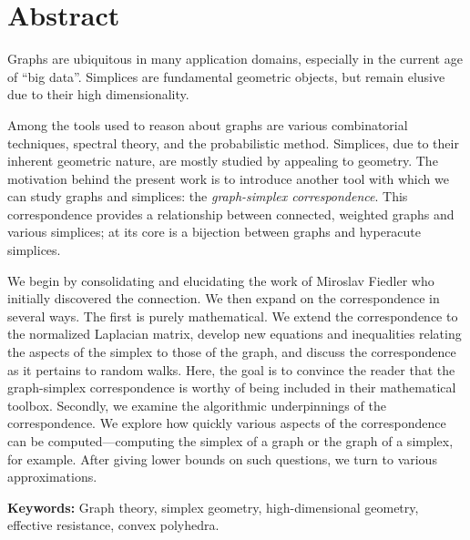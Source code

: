 \chapter*{Abstract}

Graphs are ubiquitous in many application  domains, especially in the current age of ``big data''. Simplices are fundamental geometric objects, but remain elusive due to their high dimensionality. 

Among the tools used  to  reason about graphs are various combinatorial techniques, spectral theory, and the probabilistic  method. Simplices,  due to their inherent geometric nature, are mostly studied  by appealing to  geometry. The motivation behind the present work is to introduce another tool with which  we can study graphs and simplices: the \emph{graph-simplex correspondence}. This correspondence provides a relationship between  connected, weighted graphs and  various simplices; at its core is a bijection between graphs and hyperacute simplices.  

We begin by consolidating and elucidating the work of Miroslav Fiedler who  initially discovered the connection. We then expand on the correspondence  in several  ways. The first is purely mathematical. We extend the correspondence to the normalized Laplacian matrix, develop new equations and  inequalities relating the aspects  of the simplex to those of the graph, and discuss the correspondence as it pertains to random walks. Here, the goal is to convince  the reader that the graph-simplex  correspondence is worthy of being  included in their mathematical  toolbox.  Secondly, we examine the algorithmic underpinnings of the correspondence. We explore how quickly various aspects of  the correspondence can be  computed---computing the simplex of a graph or the graph of a simplex, for example. After giving lower bounds on such questions, we turn to various  approximations.  

\vspace{1cm}
\noindent \textbf{Keywords:}  Graph theory,  simplex geometry, high-dimensional  geometry, effective resistance,  convex  polyhedra. 




